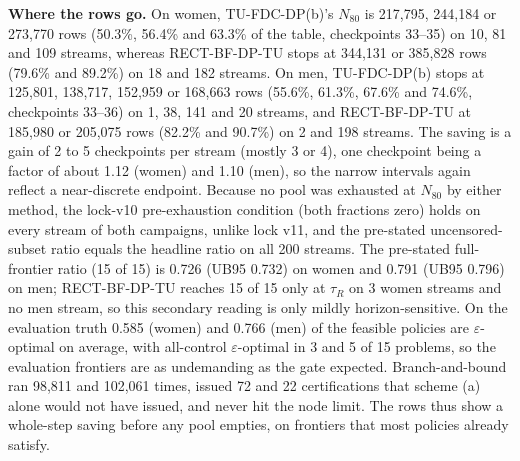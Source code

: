 \documentclass[sigconf,anonymous,review]{acmart}
\newcommand{\eps}{\varepsilon}
\begin{document}
\textbf{Where the rows go.} On women, TU-FDC-DP(b)'s $N_{80}$ is 217,795, 244,184 or 273,770 rows (50.3\%, 56.4\% and 63.3\% of the table, checkpoints 33--35) on 10, 81 and 109 streams, whereas RECT-BF-DP-TU stops at 344,131 or 385,828 rows (79.6\% and 89.2\%) on 18 and 182 streams. On men, TU-FDC-DP(b) stops at 125,801, 138,717, 152,959 or 168,663 rows (55.6\%, 61.3\%, 67.6\% and 74.6\%, checkpoints 33--36) on 1, 38, 141 and 20 streams, and RECT-BF-DP-TU at 185,980 or 205,075 rows (82.2\% and 90.7\%) on 2 and 198 streams. The saving is a gain of 2 to 5 checkpoints per stream (mostly 3 or 4), one checkpoint being a factor of about 1.12 (women) and 1.10 (men), so the narrow intervals again reflect a near-discrete endpoint. Because no pool was exhausted at $N_{80}$ by either method, the lock-v10 pre-exhaustion condition (both fractions zero) holds on every stream of both campaigns, unlike lock v11, and the pre-stated uncensored-subset ratio equals the headline ratio on all 200 streams. The pre-stated full-frontier ratio (15 of 15) is 0.726 (UB95 0.732) on women and 0.791 (UB95 0.796) on men; RECT-BF-DP-TU reaches 15 of 15 only at $\tau_R$ on 3 women streams and no men stream, so this secondary reading is only mildly horizon-sensitive. On the evaluation truth 0.585 (women) and 0.766 (men) of the feasible policies are $\eps$-optimal on average, with all-control $\eps$-optimal in 3 and 5 of 15 problems, so the evaluation frontiers are as undemanding as the gate expected. Branch-and-bound ran 98,811 and 102,061 times, issued 72 and 22 certifications that scheme (a) alone would not have issued, and never hit the node limit. The rows thus show a whole-step saving before any pool empties, on frontiers that most policies already satisfy.
\end{document}
